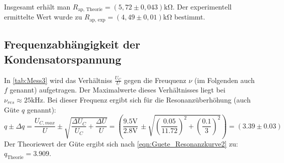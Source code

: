 Insgesamt erhält man $R_{\text{ap, Theorie}} = (5,72 \pm 0,043) \unit{\kilo\ohm}$. Der experimentell ermittelte Wert wurde 
zu $R_{\text{ap, exp}} = (4,49 \pm 0,01) \unit{\kilo\ohm}$ bestimmt.

\subsection{Frequenzabhängigkeit der Kondensatorspannung}
\label{subsec:AuswertungC}
In \autoref{tab:Mess3} wird das Verhältniss $\frac{U_C}{U}$ gegen die Freuquenz $\nu$ (im Folgenden auch $f$ genannt) aufgetragen. Der Maximalwerte dieses Verhältnisses liegt bei $\nu_{res} \approx 25 \unit{\kilo\hertz}$.
Bei dieser Frequenz ergibt sich für die Resonanzüberhöhung (auch Güte $q$ genannt):
\begin{equation}
  q \pm \Delta q = \frac{U_{C,max}}{U} \pm \sqrt{\frac{\Delta U_{C}}{U_{C}} + \frac{\Delta U}{U}}
  = \left(\frac{9.5\unit{\volt}}{2.8\unit{\volt}} \, \pm \sqrt{\left(\frac{0.05}{11.72}\right)^2 + \left(\frac{0.1}{3}\right)^2}\right)
  = \left(3.39 \pm 0.03\right)
\end{equation}
Der Theoriewert der Güte ergibt sich nach \eqref{eqn:Guete_Resonanzkurve2} zu: $q_{\text{Theorie}} = 3.909$.

